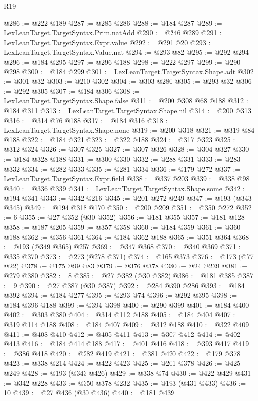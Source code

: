 \begin{lexlean}{R19}
\begin{coremodule}
@286 := @222 @189
@287 := @285 @286
@288 := @184 @287
@289 := LexLeanTarget.TargetSyntax.Prim.natAdd
@290 := @246 @289
@291 := LexLeanTarget.TargetSyntax.Expr.value
@292 := @291 @20
@293 := LexLeanTarget.TargetSyntax.Value.nat
@294 := @293 @82
@295 := @292 @294
@296 := @184 @295
@297 := @296 @188
@298 := @222 @297
@299 := @290 @298
@300 := @184 @299
@301 := LexLeanTarget.TargetSyntax.Shape.adt
@302 := @301 @32
@303 := @200 @302
@304 := @303 @280
@305 := @293 @32
@306 := @292 @305
@307 := @184 @306
@308 := LexLeanTarget.TargetSyntax.Shape.false
@311 := @200 @308 @68 @188
@312 := @184 @311
@313 := LexLeanTarget.TargetSyntax.Shape.nil
@314 := @200 @313
@316 := @314 @76 @188
@317 := @184 @316
@318 := LexLeanTarget.TargetSyntax.Shape.none
@319 := @200 @318
@321 := @319 @84 @188
@322 := @184 @321
@323 := @322 @188
@324 := @317 @323
@325 := @312 @324
@326 := @307 @325
@327 := @307 @326
@328 := @304 @327
@330 := @184 @328 @188
@331 := @300 @330
@332 := @288 @331
@333 := @283 @332
@334 := @282 @333
@335 := @281 @334
@336 := @179 @272
@337 := LexLeanTarget.TargetSyntax.Expr.field
@338 := @337 @203
@339 := @338 @98
@340 := @336 @339
@341 := LexLeanTarget.TargetSyntax.Shape.some
@342 := @194 @341
@343 := @342 @216
@345 := @201 @272 @249
@347 := @193 (@343 @345)
@349 := @194 @318 @170
@350 := @200 @209
@351 := @350 @272
@352 := 6
@355 := @27 @352 (@30 @352)
@356 := @181 @355
@357 := @181 @128
@358 := @187 @205
@359 := @357 @358
@360 := @184 @359
@361 := @360 @188
@362 := @356 @361
@364 := @184 @362 @188
@365 := @351 @364
@368 := @193 (@349 @365) @257
@369 := @347 @368
@370 := @340 @369
@371 := @335 @370
@373 := @273 (@278 @371)
@374 := @165 @373
@376 := @173 (@77 @22)
@378 := @175 @99 @83
@379 := @376 @378
@380 := @24 @239
@381 := @279 @380
@382 := 8
@385 := @27 @382 (@30 @382)
@386 := @181 @385
@387 := 9
@390 := @27 @387 (@30 @387)
@392 := @284 @390 @286
@393 := @184 @392
@394 := @184 @277
@395 := @293 @74
@396 := @292 @395
@398 := @184 @396 @188
@399 := @394 @398
@400 := @290 @399
@401 := @184 @400
@402 := @303 @380
@404 := @314 @112 @188
@405 := @184 @404
@407 := @319 @114 @188
@408 := @184 @407
@409 := @312 @188
@410 := @322 @409
@411 := @408 @410
@412 := @405 @411
@413 := @307 @412
@414 := @402 @413
@416 := @184 @414 @188
@417 := @401 @416
@418 := @393 @417
@419 := @386 @418
@420 := @282 @419
@421 := @381 @420
@422 := @179 @378
@423 := @338 @214
@424 := @422 @423
@425 := @201 @378
@426 := @425 @249
@428 := @193 (@343 @426)
@429 := @338 @74
@430 := @422 @429
@431 := @342 @228
@433 := @350 @378 @232
@435 := @193 (@431 @433)
@436 := 10
@439 := @27 @436 (@30 @436)
@440 := @181 @439

\end{coremodule}
\end{lexlean}
